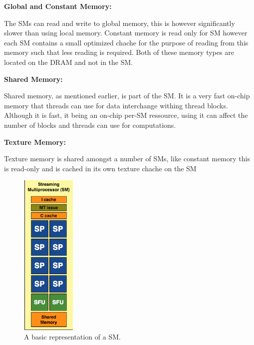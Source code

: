 \textbf{Global and Constant Memory:}

The SMs can read and write to global memory, this is however significantly slower than using local memory. %
Constant memory is read only for SM however each SM contains a small optimized chache for the purpose of reading from this memory such that less reading is required. Both of these memory types are located on the DRAM and not in the SM.

\textbf{Shared Memory:}

Shared memory, as mentioned earlier, is part of the SM.
It is a very fast on-chip memory that threads can use for data interchange withing thread blocks.
Although it is fast, it being an on-chip per-SM ressource, using it can affect the number of blocks and threads can use for computations.

\textbf{Texture Memory:}

Texture memory is shared amongst a number of SMs, like constant memory this is read-only and is cached in its own texture chache on the SM

\begin{figure}
 \vspace{-50pt}
 \begin{center}
  \includegraphics[width=0.23\textwidth]{figures/SM.png}
 \end{center}
 \caption{A basic representation of a SM.}\label{image:SM} 
 \vspace{-35pt}
\end{figure}
